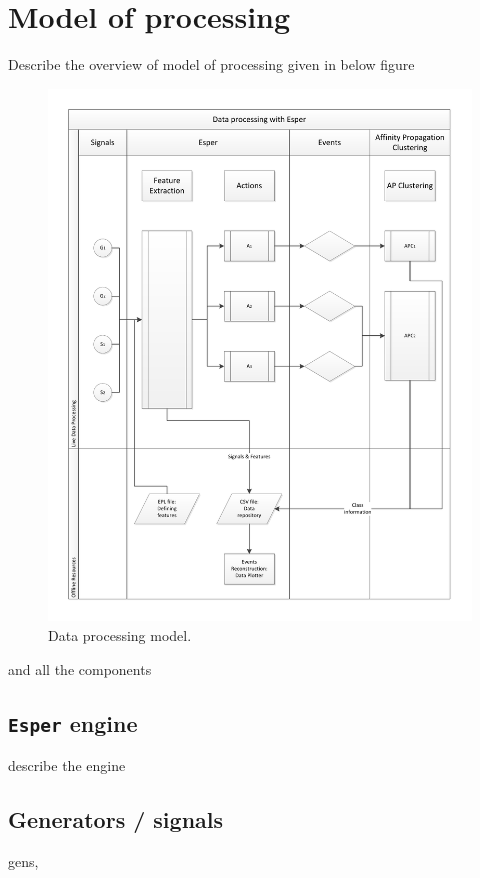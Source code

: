 \documentclass[11pt, letterpaper]{article}            %
\begin{document}
\section{Model of processing}
Describe the overview of model of processing given in below figure\\
\begin{figure}[htbp]
	\centering
	\includegraphics[width=\textwidth]{./gfx/model.pdf}
  \caption{Data processing model.\label{fig:model}}
\end{figure}
and all the components\\

\subsection{\texttt{Esper} engine}
describe the engine\\

\subsection{Generators / signals}
gens, \\
\end{document}
